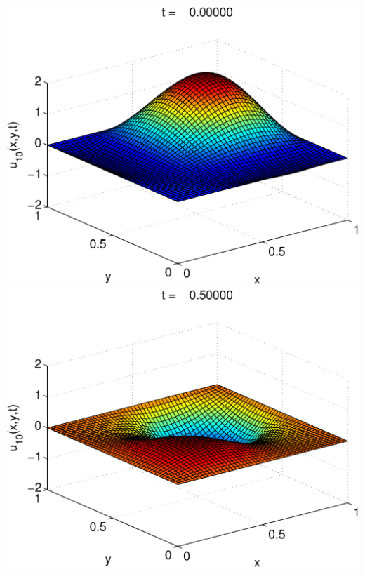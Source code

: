 \begin{solution}
\begin{enumerate}
\begin{center}
\includegraphics[scale=0.37]{wave2d_1} \quad
\includegraphics[scale=0.37]{wave2d_2} 


\end{center}
\end{enumerate}
\end{solution}
